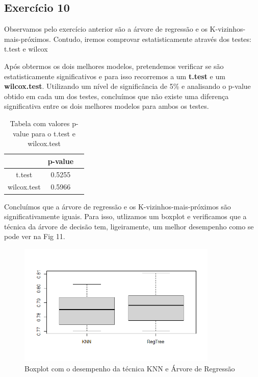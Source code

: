 \subsection{Exercício 10}

Observamos pelo exercício anterior são a árvore de regressão e os K-vizinhos-mais-próximos. Contudo, iremos comprovar estatisticamente através dos testes: t.test e wilcox

Após obtermos os dois melhores modelos, pretendemos verificar se são estatisticamente significativos e para isso recorremos a um \textbf{t.test} e um \textbf{wilcox.test}. Utilizando um nível de significância de 5\% e analisando o p-value obtido em cada um dos testes, concluímos que não existe uma diferença significativa entre os dois melhores modelos para ambos os testes.

\begin{table}[h!]
	\caption{Tabela com valores p-value para o t.test e wilcox.test}
    \begin{center}
    \begin{tabular}{|c|c|c|}
    \hline
    & \textbf{p-value} \\
    \hline
    t.test & 0.5255\\
    \hline
    wilcox.test & 0.5966\\
    \hline
    \end{tabular}
    \label{tab:my_label}
    \end{center}
\end{table}

Concluímos que a árvore de regressão e os K-vizinhos-mais-próximos são significativamente iguais. Para isso, utlizamos um boxplot e verificamos que a técnica da árvore de decisão tem, ligeiramente, um melhor desempenho como se pode ver na Fig 11.

\begin{figure}[htbp]
\centerline{\includegraphics[width=9.5cm]{images/ex10_boxplot.png}}
\caption{Boxplot com o desempenho da técnica KNN e Árvore de Regressão}
\label{ex10_boxplot}
\end{figure}
